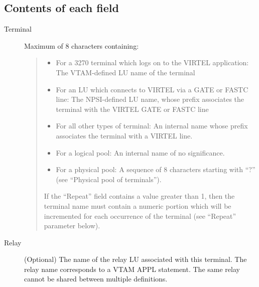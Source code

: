 \documentclass[letterpaper,10pt,english]{sphinxmanual}
\begin{document}
\subsection{Contents of each field}
\label{\detokenize{connectivity_guide:contents-of-each-field}}\begin{description}
\item[{Terminal}] \leavevmode
Maximum of 8 characters containing:
\begin{quote}
\begin{itemize}
\item {} 
For a 3270 terminal which logs on to the VIRTEL application: The VTAM-defined LU name of the terminal

\item {} 
For an LU which connects to VIRTEL via a GATE or FASTC line: The NPSI-defined LU name, whose prefix associates the terminal with the VIRTEL GATE or FASTC line

\item {} 
For all other types of terminal: An internal name whose prefix associates the terminal with a VIRTEL line.

\item {} 
For a logical pool: An internal name of no significance.

\item {} 
For a physical pool: A sequence of 8 characters starting with “?” (see “Physical pool of terminals”).

\end{itemize}

If the “Repeat” field contains a value greater than 1, then the terminal name must contain a numeric portion which will be incremented for each occurrence of the terminal (see “Repeat” parameter below).
\end{quote}

\item[{Relay}] \leavevmode
(Optional) The name of the relay LU associated with this terminal. The relay name corresponds to a VTAM APPL statement. The same relay cannot be shared between multiple definitions.


\end{description}
\end{document}
